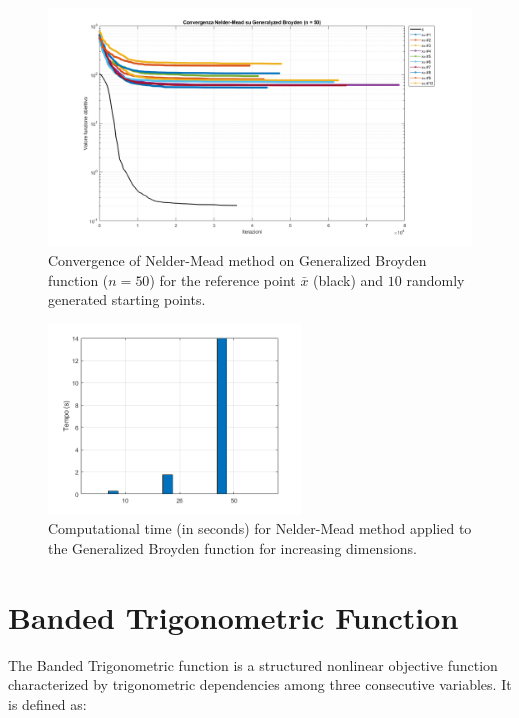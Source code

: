 \documentclass[a4paper,12pt]{article}
\begin{document}
	\begin{figure}[htbp]
		\centering
		\includegraphics[width=\textwidth]{../immagini/broyden_50.png}
		\caption{Convergence of Nelder-Mead method on Generalized Broyden function ($n=50$) for the reference point $\bar{x}$ (black) and $10$ randomly generated starting points.}
		\label{fig:gb_nelder_50}
	\end{figure}
	
	\begin{figure}[htbp]
		\centering
		\includegraphics[width=0.6\textwidth]{../immagini/broyden_time_nelder.png}
		\caption{Computational time (in seconds) for Nelder-Mead method applied to the Generalized Broyden function for increasing dimensions.}
		\label{fig:gb_nelder_time}
	\end{figure}
	
	
	\section{Banded Trigonometric Function}
	
	The Banded Trigonometric function is a structured nonlinear objective function characterized by trigonometric dependencies among three consecutive variables. It is defined as:
	
\end{document}

